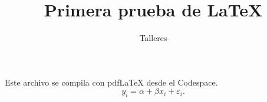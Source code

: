 \documentclass{article}
\title{Primera prueba de \LaTeX}
\author{Talleres}
\date{}
\begin{document}
\maketitle
Este archivo se compila con pdfLaTeX desde el Codespace.
\[
  y_i = \alpha + \beta x_i + \varepsilon_i.
\]
\end{document}
